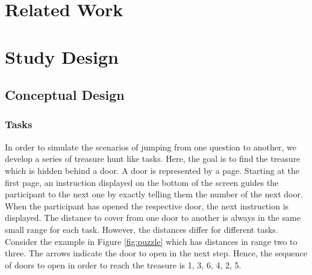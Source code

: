 \documentclass{sig-alternate-05-2015}
\begin{document}
\section{Related Work}

\section{Study Design}
\subsection{Conceptual Design}
\subsubsection{Tasks}
In order to simulate the scenarios of jumping from one question to another, we develop a series of treasure hunt like tasks. Here, the goal is to find the treasure which
is hidden behind a door. A door is represented by a page. Starting at the first page, an instruction displayed on the bottom of the screen guides the participant to the next one
by exactly telling them the number of the next door. When the participant has opened the respective door, the next
instruction is displayed. The distance to cover from one door to another is always in the same small range for each task. However, the distances differ for
different tasks. Consider the example in Figure \ref{fig:puzzle} which has distances in range two to three. The arrows indicate the door to open in
the next step. Hence, the sequence of doors to open in order to reach the treasure is 1, 3, 6, 4, 2, 5.
\end{document}
